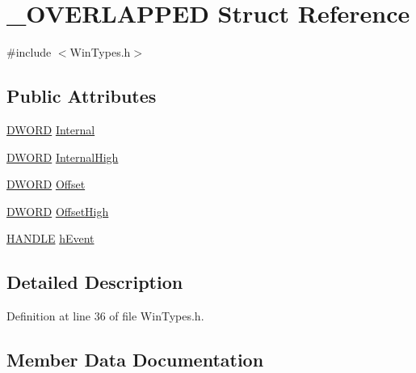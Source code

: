 \hypertarget{struct__OVERLAPPED}{}\section{\+\_\+\+O\+V\+E\+R\+L\+A\+P\+P\+ED Struct Reference}
\label{struct__OVERLAPPED}


{\ttfamily \#include $<$Win\+Types.\+h$>$}

\subsection*{Public Attributes}
\begin{DoxyCompactItemize}
\item 
\hyperlink{CatCaloProto40MHz_2inc_2WinTypes_8h_ad342ac907eb044443153a22f964bf0af}{D\+W\+O\+RD} \hyperlink{struct__OVERLAPPED_a2253d58d3120adff7f6d0242400bc7b4}{Internal}
\item 
\hyperlink{CatCaloProto40MHz_2inc_2WinTypes_8h_ad342ac907eb044443153a22f964bf0af}{D\+W\+O\+RD} \hyperlink{struct__OVERLAPPED_a577d8d492b8872fb1840947e2d2b06a7}{Internal\+High}
\item 
\hyperlink{CatCaloProto40MHz_2inc_2WinTypes_8h_ad342ac907eb044443153a22f964bf0af}{D\+W\+O\+RD} \hyperlink{struct__OVERLAPPED_a60b84fb65a45c8383a5274b38a3f4896}{Offset}
\item 
\hyperlink{CatCaloProto40MHz_2inc_2WinTypes_8h_ad342ac907eb044443153a22f964bf0af}{D\+W\+O\+RD} \hyperlink{struct__OVERLAPPED_a07370c1d35023959e51450a8e91c5a32}{Offset\+High}
\item 
\hyperlink{CatCaloProto40MHz_2inc_2WinTypes_8h_aa8c0374618b33785ccb02f74bcfebc46}{H\+A\+N\+D\+LE} \hyperlink{struct__OVERLAPPED_aa34d425458cd9ae57e8a8bf5aadc2923}{h\+Event}
\end{DoxyCompactItemize}


\subsection{Detailed Description}


Definition at line 36 of file Win\+Types.\+h.



\subsection{Member Data Documentation}
\mbox{\label{struct__OVERLAPPED_aa34d425458cd9ae57e8a8bf5aadc2923}} 
